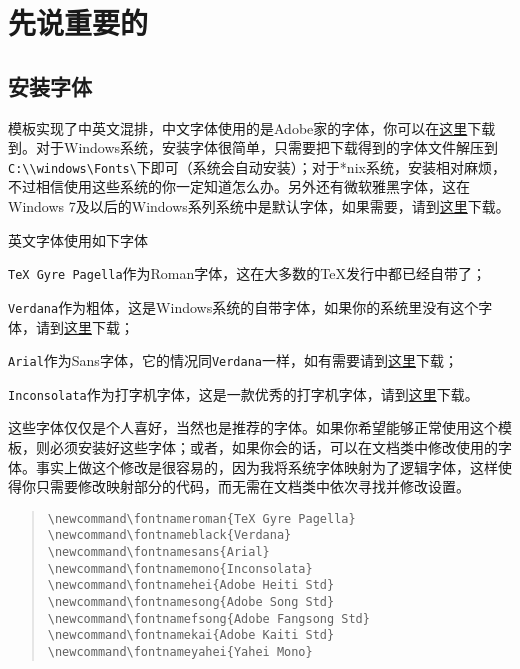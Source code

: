 \chapter{先说重要的}
\section{安装字体}
模板实现了中英文混排，中文字体使用的是Adobe家的字体，你可以在\href{http://ishare.iask.sina.com.cn/f/15105086.html}{这里}下载到。对于Windows系统，安装字体很简单，只需要把下载得到的字体文件解压到
\verb|C:\\windows\Fonts\|下即可（系统会自动安装）；对于*nix系统，安装相对麻烦，不过相信使用这些系统的你一定知道怎么办。另外还有微软雅黑字体，这在Windows 7及以后的Windows系列系统中是默认字体，如果需要，请到\href{http://xiazai.zol.com.cn/detail/26/253442.shtml}{这里}下载。

英文字体使用如下字体
\begin{compactitem}
\item \texttt{TeX Gyre Pagella}作为Roman字体，这在大多数的\TeX{}发行中都已经自带了；
\item \texttt{Verdana}作为粗体，这是Windows系统的自带字体，如果你的系统里没有这个字体，请到\href{http://www.font5.com.cn/font_download.php?id=900&part=1249309256}{这里}下载；
\item \texttt{Arial}作为Sans字体，它的情况同\texttt{Verdana}一样，如有需要请到\href{http://font.chinaz.com/120308013581.htm}{这里}下载；
\item \texttt{Inconsolata}作为打字机字体，这是一款优秀的打字机字体，请到\href{http://ishare.iask.sina.com.cn/f/20566600.html}{这里}下载。
\end{compactitem}

这些字体仅仅是个人喜好，当然也是推荐的字体。如果你希望能够正常使用这个模板，则必须安装好这些字体；或者，如果你会的话，可以在文档类中修改使用的字体。事实上做这个修改是很容易的，因为我将系统字体映射为了逻辑字体，这样使得你只需要修改映射部分的代码，而无需在文档类中依次寻找并修改设置。
\begin{quote}
\begin{verbatim}
\newcommand\fontnameroman{TeX Gyre Pagella}
\newcommand\fontnameblack{Verdana}
\newcommand\fontnamesans{Arial}
\newcommand\fontnamemono{Inconsolata}
\newcommand\fontnamehei{Adobe Heiti Std}
\newcommand\fontnamesong{Adobe Song Std}
\newcommand\fontnamefsong{Adobe Fangsong Std}
\newcommand\fontnamekai{Adobe Kaiti Std}  
\newcommand\fontnameyahei{Yahei Mono}
\end{verbatim}
\end{quote}
